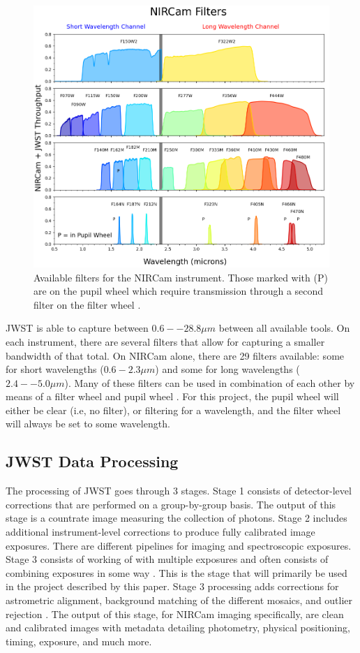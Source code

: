 \documentclass[10pt,twocolumn,letterpaper]{article}
\begin{document}
\begin{figure}[t]
  \centering
  \includegraphics[scale=0.33]{filters}
  \caption{Available filters for the NIRCam instrument. Those marked with (P) are on the pupil wheel which require transmission through a second filter on the filter wheel \cite{webbfilters}.}
  \label{fig:filters}
\end{figure}

JWST is able to capture between $0.6 -- 28.8\mu m$ between all available tools. On each instrument, there are several filters that allow for capturing a smaller bandwidth of that total.
On NIRCam alone, there are 29 filters available: some for short wavelengths ($0.6-2.3 \mu m$) and some for long wavelengths ($2.4 -- 5.0 \mu m$). Many of these filters can be used in combination of each other by means of a filter wheel and pupil wheel \cite{webbfilters}. 
For this project, the pupil wheel will either be clear (i.e, no filter), or filtering for a wavelength, and the filter wheel will always be set to some wavelength.

\subsection{JWST Data Processing}

The processing of JWST goes through 3 stages. Stage 1 consists of detector-level corrections that are performed on a group-by-group basis. The output of this stage is a countrate image measuring the collection of photons.
Stage 2 includes additional instrument-level corrections to produce fully calibrated image exposures. There are different pipelines for imaging and spectroscopic exposures.
Stage 3 consists of working of with multiple exposures and often consists of combining exposures in some way \cite{webbstages}. 
This is the stage that will primarily be used in the project described by this paper. Stage 3 processing adds corrections for astrometric alignment, background matching of the different mosaics, and outlier rejection \cite{webbstage3}. 
The output of this stage, for NIRCam imaging specifically, are clean and calibrated images with metadata detailing photometry, physical positioning, timing, exposure, and much more.
\end{document}
